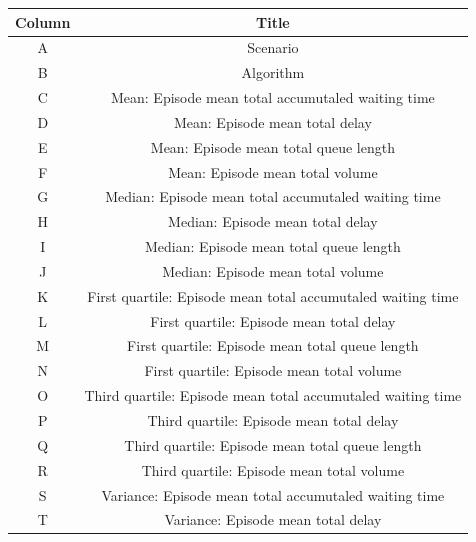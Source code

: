 \begin{table}[htbp]
\centering
\setlength\tabcolsep{2pt}
\begin{tabular}{|c|c|}
\hline
Column &                                                           Title \\
\hline
     A &                                                        Scenario \\
     B &                                                       Algorithm \\
     C &               Mean: Episode mean total accumutaled waiting time \\
     D &                                  Mean: Episode mean total delay \\
     E &                           Mean: Episode mean total queue length \\
     F &                                 Mean: Episode mean total volume \\
     G &             Median: Episode mean total accumutaled waiting time \\
     H &                                Median: Episode mean total delay \\
     I &                         Median: Episode mean total queue length \\
     J &                               Median: Episode mean total volume \\
     K &     First quartile: Episode mean total accumutaled waiting time \\
     L &                        First quartile: Episode mean total delay \\
     M &                 First quartile: Episode mean total queue length \\
     N &                       First quartile: Episode mean total volume \\
     O &     Third quartile: Episode mean total accumutaled waiting time \\
     P &                        Third quartile: Episode mean total delay \\
     Q &                 Third quartile: Episode mean total queue length \\
     R &                       Third quartile: Episode mean total volume \\
     S &           Variance: Episode mean total accumutaled waiting time \\
     T &                              Variance: Episode mean total delay \\

\end{tabular}
\end{table}

